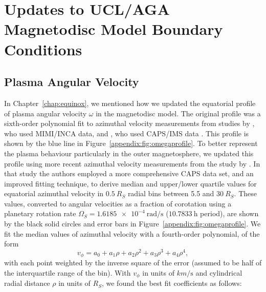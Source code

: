 \appendix
\chapter{Updates to UCL/AGA Magnetodisc Model Boundary Conditions} \label{appendix:sec:wilsonfits}
\section{Plasma Angular Velocity}\label{appendix:sec:plasmaomega}
In Chapter~\ref{chap:equinox}, we mentioned how we updated the equatorial profile of plasma angular velocity $\omega$ in the magnetodisc model. The original profile was a sixth-order polynomial fit to azimuthal velocity measurements from studies by \citet{kane2008}, who used MIMI/INCA data, and \citet{wilson2008}, who used CAPS/IMS data \citep[more detail in][]{achilleos2010a}. This profile is shown by the blue line in Figure~\ref{appendix:fig:omegaprofile}. To better represent the plasma behaviour particularly in the outer magnetosphere, we updated this profile using more recent azimuthal velocity measurements from the study by \citet{wilson2017}. In that study the authors employed a more comprehensive CAPS data set, and an improved fitting technique, to derive median and upper/lower quartile values for equatorial azimuthal velocity in $\SI{0.5}{R_S}$ radial bins between 5.5 and $\SI{30}{R_S}$. These values, converted to angular velocities as a fraction of corotation using a planetary rotation rate $\Omega_S = \SI{1.6185e-4}{\radian\per\second}$ ($\SI{10.7833}{\hour}$ period), are shown by the black solid circles and error bars in Figure~\ref{appendix:fig:omegaprofile}. We fit the median values of azimuthal velocity with a fourth-order polynomial, of the form 
\begin{equation} \label{appendix:eq:fourthorderpolyv}
v_\phi =  a_0 + a_1\rho + a_2\rho^2 + a_3\rho^3 + a_4\rho^4,
\end{equation}
with each point weighted by the inverse square of the error (assumed to be half of the interquartile range of the bin). With $v_\phi$ in units of $\si{km\per\second}$ and cylindrical radial distance $\rho$ in units of $\si{R_S}$, we found the best fit coefficients as follows:
